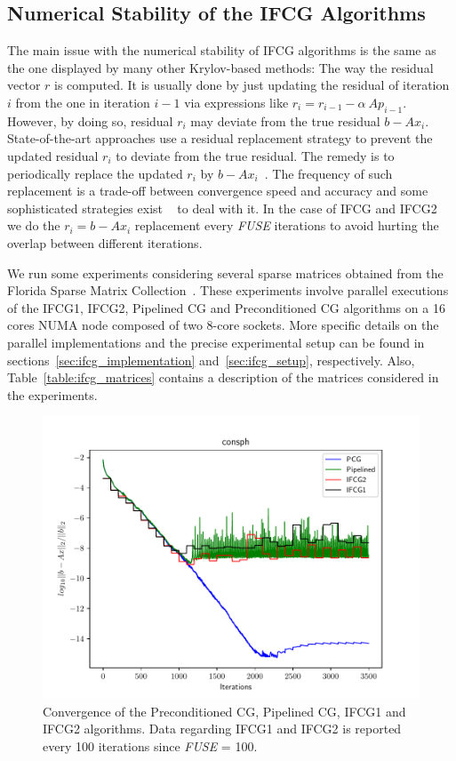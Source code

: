 \subsection{Numerical Stability of the IFCG Algorithms}
\label{sec:ifcg_stability}
The main issue with the numerical stability of IFCG algorithms is the same as the one displayed by many other Krylov-based methods: The way the residual vector $r$ is computed.
It is usually done by just updating the residual of iteration $i$ from the one in iteration $i-1$ via expressions like $r_{i} = r_{i-1} - \alpha~Ap_{i-1}$.
However, by doing so, residual $r_{i}$ may deviate from the true residual $b-Ax_{i}$.
State-of-the-art approaches use a residual replacement strategy to prevent the updated residual $r_{i}$ to deviate from the true residual.
The remedy is to periodically replace the updated $r_{i}$ 
by $b-Ax_{i}$~\cite{carson, vorst99, ghysels14}.
The frequency of such replacement is a trade-off between convergence speed and accuracy and some sophisticated strategies exist 
~\cite{demmel14, vorst99} to deal with it. 
In the case of IFCG and IFCG2 
we do the $r_{i} = b-Ax_{i}$ replacement every \emph{FUSE} iterations to avoid hurting the overlap between different iterations.

We run some experiments considering several sparse matrices obtained from the Florida Sparse Matrix Collection~\cite{florida}.
These experiments involve parallel executions of the IFCG1, IFCG2, Pipelined CG and Preconditioned CG algorithms on a 16 cores NUMA node composed of two 8-core sockets.
More specific details on the parallel implementations and the precise 
experimental setup can be found in sections~\ref{sec:ifcg_implementation} and~\ref{sec:ifcg_setup}, respectively.
Also, Table~\ref{table:ifcg_matrices} contains a description of the matrices considered in the experiments.

\begin{figure}[bhtp]
	\centerline{\includegraphics[scale=0.70]{ifcg/figs/mt_prec/cg_history_consph.pdf}}
	\vspace{-0.4cm}
	\caption{Convergence of the Preconditioned CG, Pipelined CG, IFCG1 and IFCG2 algorithms. Data regarding IFCG1 and IFCG2 is reported every 100 iterations since \emph{FUSE} = 100.}
	\label{prec}
	\vspace{-0.4cm}
\end{figure}


